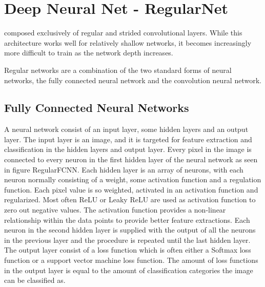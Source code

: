 \section{Deep Neural Net - RegularNet}
composed exclusively of regular and strided convolutional layers. While this architecture works well for relatively shallow networks, it becomes increasingly more difficult to train as the network depth increases.

Regular networks are a combination of the two standard forms of neural networks, the fully connected neural network and the convolution neural network.

\subsection{Fully Connected Neural Networks}
A neural network consist of an input layer, some hidden layers and an output layer. The input layer is an image, and it is targeted for feature extraction and classification in the hidden layers and output layer. Every pixel in the image is connected to every neuron in the first hidden layer of the neural network as seen in figure RegularFCNN.    
Each hidden layer is an array of neurons, with each neuron normally consisting of a weight, some activation function and a regulation function. Each pixel value is so weighted, activated in an activation function and regularized. Most often ReLU or Leaky ReLU are used as activation function to zero out negative values. The activation function provides a non-linear relationship within the data points to provide better feature extractions. Each neuron in the second hidden layer is supplied with the output of all the neurons in the previous layer and the procedure is repeated until the last hidden layer. The output layer consist of a loss function which is often either a Softmax loss function or a support vector machine loss function. The amount of loss functions in the output layer is equal to the amount of classification categories the image can be classified as.

